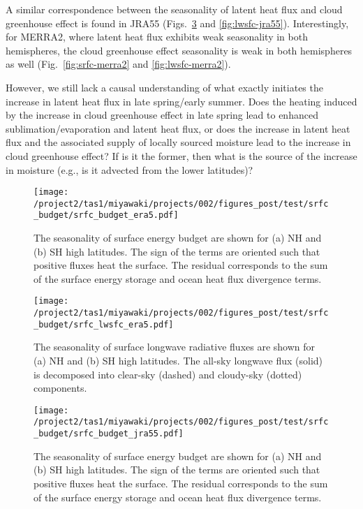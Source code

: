 \documentclass{article}
\begin{document}
A similar correspondence between the seasonality of latent heat flux and cloud greenhouse effect is found in JRA55 (Figs.~\ref{fig:srfc-jra55} and \ref{fig:lwsfc-jra55}). Interestingly, for MERRA2, where latent heat flux exhibits weak seasonality in both hemispheres, the cloud greenhouse effect seasonality is weak in both hemispheres as well (Fig.~\ref{fig:srfc-merra2} and \ref{fig:lwsfc-merra2}).

However, we still lack a causal understanding of what exactly initiates the increase in latent heat flux in late spring/early summer. Does the heating induced by the increase in cloud greenhouse effect in late spring lead to enhanced sublimation/evaporation and latent heat flux, or does the increase in latent heat flux and the associated supply of locally sourced moisture lead to the increase in cloud greenhouse effect? If is it the former, then what is the source of the increase in moisture (e.g., is it advected from the lower latitudes)?

\begin{figure}
    \texttt{[image: /project2/tas1/miyawaki/projects/002/figures\_post/test/srfc\_budget/srfc\_budget\_era5.pdf]}
    \caption{The seasonality of surface energy budget are shown for (a) NH and (b) SH high latitudes. The sign of the terms are oriented such that positive fluxes heat the surface. The residual corresponds to the sum of the surface energy storage and ocean heat flux divergence terms.}
    \label{fig:srfc-era5}
\end{figure}

\begin{figure}
    \texttt{[image: /project2/tas1/miyawaki/projects/002/figures\_post/test/srfc\_budget/srfc\_lwsfc\_era5.pdf]}
    \caption{The seasonality of surface longwave radiative fluxes are shown for (a) NH and (b) SH high latitudes. The all-sky longwave flux (solid) is decomposed into  clear-sky (dashed) and cloudy-sky (dotted) components.}
    \label{fig:lwsfc-era5}
\end{figure}

\begin{figure}
    \texttt{[image: /project2/tas1/miyawaki/projects/002/figures\_post/test/srfc\_budget/srfc\_budget\_jra55.pdf]}
    \caption{The seasonality of surface energy budget are shown for (a) NH and (b) SH high latitudes. The sign of the terms are oriented such that positive fluxes heat the surface. The residual corresponds to the sum of the surface energy storage and ocean heat flux divergence terms.}
    \label{fig:srfc-jra55}
\end{figure}
\end{document}
